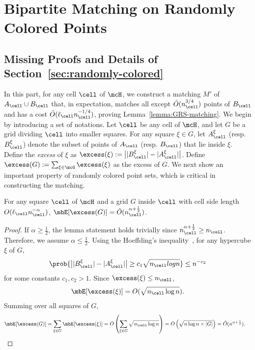 \section{Bipartite Matching on Randomly Colored Points}

\subsection{Missing Proofs and Details of Section~\ref{sec:randomly-colored}}\label{appendix-randomly-colored}

 In this part, for any cell $\cell$ of $\mcH$, we construct a matching $M'$ of $A_\cell\cup B_\cell$ that, in expectation, matches all except $\tilde{O}(n_\cell^{3/4})$ points of $B_\cell$ and has a cost $\tilde{O}(\ell_\cell n_\cell^{-1/4})$, proving Lemma~\ref{lemma:GRS-matching}.
We begin by introducing a set of notations. Let $\cell$ be any cell of $\mcH$, and let $G$ be a grid dividing $\cell$ into smaller squares.
For any square $\xi\in G$, let $A_\cell^\xi$ (resp. $B_\cell^\xi$) denote the subset of points of $A_\cell$ (resp. $B_\cell$) that lie inside $\xi$. Define the \emph{excess} of $\xi$ as $\excess(\xi):=\big||B_\cell^\xi| - |A_\cell^\xi|\big|$. Define $\excess(G):=\sum_{\xi\in\mcG}\excess(\xi)$ as the excess of $G$. We next show an important property of randomly colored point sets, which is critical in constructing the matching. 


\begin{lemma}\label{lemma:convergence_excess}
    For any square $\cell$ of $\mcH$ and a grid $G$ inside $\cell$ with cell side length $O(\ell_\cell n_\cell^{-\alpha})$, $\mbE[\excess(G)]= \tilde{O}(n_\cell^{\alpha + \frac{1}{2}})$. 
\end{lemma}
\begin{proof}
    If $\alpha\ge \frac{1}{2}$, the lemma statement holds trivially since $n_\cell^{\alpha+\frac{1}{2}} \ge n_\cell$. Therefore, we assume $\alpha\le \frac{1}{2}$.
    Using the Hoeffding’s inequality~\cite{hoeffding1994probability}, for any hypercube $\xi$ of $G$,
    \begin{equation*}
        \prob{\big||B_\cell^\xi| - |A_\cell^\xi|\big|\ge c_1\sqrt{n_\cell log n}}\le n^{-c_2}\label{eq:excess}
    \end{equation*}
    for some constants $c_1, c_2 > 1$. Since $\excess(\xi)\le n_\cell$, 
    \begin{equation*}
        \mbE[\excess(\xi)]= O(\sqrt{n_\cell\log n}).\label{eq:excess_cell}
    \end{equation*}
    Summing over all squares of $G$,
    \begin{align*}
        \mbE[\excess(G)] = \sum_{\xi\in G} \mbE[\excess(\xi)] &=O\left(\sum_{\xi\in G} \sqrt{n_\cell\log n}\right) = O\left(\sqrt{n\log n\times |G|}\right) = \tilde{O}(n^{\alpha+\frac{1}{2}}).\label{eq:excess-dense}
    \end{align*}
\end{proof}

